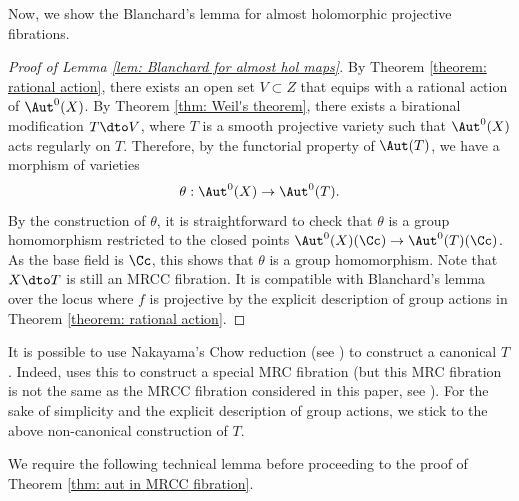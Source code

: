 \documentclass[11pt]{amsart}
\begin{document}
Now, we show the Blanchard's lemma for almost holomorphic projective fibrations.

\begin{proof}[Proof of Lemma \ref{lem: Blanchard for almost hol maps}]
By Theorem \ref{theorem: rational action}, there exists an open set $V \subset Z$ that equips with a rational action of $\Aut^0(X)$. By Theorem \ref{thm: Weil's theorem}, there exists a birational modification $T \dto V$, where $T$ is a smooth projective variety such that $\Aut^0(X)$ acts regularly on $T$. Therefore, by the functorial property of $ \Aut(T)$, we have a morphism of varieties
\[
\theta: \Aut^0(X) \to \Aut^0(T).
\] By the construction of $\theta$, it is straightforward to check that $\theta$ is a group homomorphism restricted to the closed points $ \Aut^0(X)(\Cc) \to \Aut^0(T)(\Cc)$. As the base field is $\Cc$, this shows that $\theta$ is a group homomorphism. Note that $X \dto T$ is still an MRCC fibration. It is compatible with Blanchard's lemma over the locus where $f$ is projective by the explicit description of group actions in Theorem \ref{theorem: rational action}.
\end{proof}

\begin{remark}\label{rmk: canonical choice of Z}
    It is possible to use Nakayama's Chow reduction (see \cite[Definition 4.15]{Nak10}) to construct a canonical $T$. Indeed, \cite[Theorem 4.18, Theorem 4.19]{Nak10} uses this to construct a special MRC fibration (but this MRC fibration is not the same as the MRCC fibration considered in this paper, see \cite[Remark after Theorem 4.18]{Nak10}). For the sake of simplicity and the explicit description of group actions, we stick to the above non-canonical construction of $T$.
\end{remark}

We require the following technical lemma before proceeding to the proof of Theorem \ref{thm: aut in MRCC fibration}.
\end{document}
